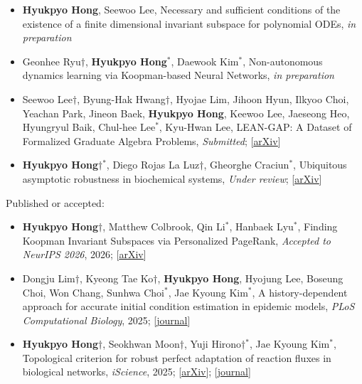 \documentclass[margin,line]{res}
\begin{document}
\begin{resume}
\begin{itemize}[leftmargin=*]
    \item[17.] \textbf{Hyukpyo Hong}, Seewoo Lee, Necessary and sufficient conditions of the existence of a finite dimensional invariant subspace for polynomial ODEs, \textit{in preparation}

    \item[16.] Geonhee Ryu$\dagger$, \textbf{Hyukpyo Hong}${}^*$, Daewook Kim${}^*$, Non-autonomous dynamics learning via Koopman-based Neural Networks, \textit{in preparation}

    \item[15.] Seewoo Lee$\dagger$, Byung-Hak Hwang$\dagger$, Hyojae Lim, Jihoon Hyun, Ilkyoo Choi, Yeachan Park, Jineon Baek, \textbf{Hyukpyo Hong}, Keewoo Lee, Jaeseong Heo, Hyungryul Baik, Chul-hee Lee${}^*$, Kyu-Hwan Lee, LEAN-GAP: A Dataset of Formalized Graduate Algebra Problems, \textit{Submitted}; [\href{https://doi.org/10.48550/arXiv.2606.02588}{\ul{arXiv}}]

    \item[14.] \textbf{Hyukpyo Hong}$\dagger$${}^*$, Diego Rojas La Luz$\dagger$, Gheorghe Craciun${}^*$, Ubiquitous asymptotic robustness in biochemical systems, \textit{Under review}; [\href{https://doi.org/10.48550/arXiv.2505.21900}{\ul{arXiv}}]

\end{itemize}

\vspace{-5pt}
Published or accepted: \vspace{7pt}
\begin{itemize}[leftmargin=*]
    \item[13.] \textbf{Hyukpyo Hong}$\dagger$, Matthew Colbrook, Qin Li${}^*$, Hanbaek Lyu${}^*$, Finding Koopman Invariant Subspaces via Personalized PageRank, \textit{Accepted to NeurIPS 2026}, 2026; [\href{https://doi.org/10.48550/arXiv.2605.24666}{\ul{arXiv}}]

    \item[12.] Dongju Lim$\dagger$, Kyeong Tae Ko$\dagger$, \textbf{Hyukpyo Hong}, Hyojung Lee, Boseung Choi, Won Chang, Sunhwa Choi${}^*$, Jae Kyoung Kim${}^*$, A history-dependent approach for accurate initial condition estimation in epidemic models, \textit{PLoS Computational Biology}, 2025; [\href{https://doi.org/10.1371/journal.pcbi.1013438}{\ul{journal}}]

    \item[11.] \textbf{Hyukpyo Hong}$\dagger$, Seokhwan Moon$\dagger$, Yuji Hirono$\dagger$${}^*$, Jae Kyoung Kim${}^*$, Topological criterion for robust perfect adaptation of reaction fluxes in biological networks, \textit{iScience}, 2025; [\href{https://doi.org/10.48550/arXiv.2302.01270}{\ul{arXiv}}]; [\href{https://doi.org/10.1016/j.isci.2025.112394}{\ul{journal}}]


\end{itemize}
\end{resume}
\end{document}
